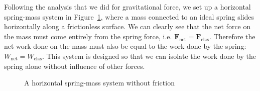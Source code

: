 Following the analysis that we did for gravitational force, we set up a
horizontal spring-mass system in Figure~\ref{fig:hspring-mass1}, where a mass
connected to an ideal spring slides horizontally along a frictionless surface.
We can clearly see that the net force on the mass must come entirely from the
spring force, i.e. $\bm F_\text{net}=\bm F_\text{elas}$. Therefore the net work
done on the mass must also be equal to the work done by the spring:
$W_\text{net}=W_\text{elas}$. This system is designed so that we can isolate the
work done by the spring alone without influence of other forces.
\begin{figure}[ht]
  \centering
  \caption{A horizontal spring-mass system without friction}
  \label{fig:hspring-mass1}
\end{figure}

